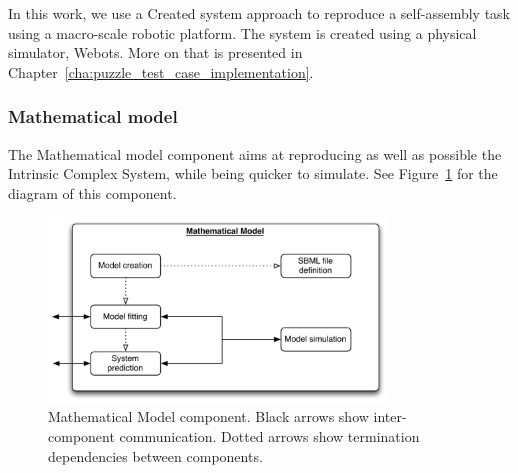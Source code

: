 In this work, we use a Created system approach to reproduce a self-assembly task using a macro-scale robotic platform. The system is created using a physical simulator, Webots. More on that is presented in Chapter~\ref{cha:puzzle_test_case_implementation}.


\subsubsection{Mathematical model} %
\label{ssub:mathematical_model}

The Mathematical model component aims at reproducing as well as possible the Intrinsic Complex System, while being quicker to simulate. See Figure~\ref{fig:img_mathematical_model} for the diagram of this component.

\begin{figure}[h!]
	\centering
		\includegraphics[width=9cm]{img/mathematical_model.pdf}
	\caption{Mathematical Model component. Black arrows show inter-component communication. Dotted arrows show termination dependencies between components.}
	\label{fig:img_mathematical_model}
\end{figure}

